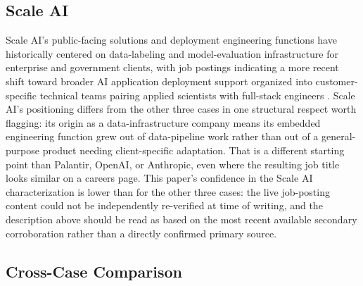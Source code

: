 \documentclass[journal]{IEEEtran}
\begin{document}
\subsection{Scale AI}

Scale AI's public-facing solutions and deployment engineering functions have historically centered on data-labeling and model-evaluation infrastructure for enterprise and government clients, with job postings indicating a more recent shift toward broader AI application deployment support organized into customer-specific technical teams pairing applied scientists with full-stack engineers \cite{scaleai2026fde}. Scale AI's positioning differs from the other three cases in one structural respect worth flagging: its origin as a data-infrastructure company means its embedded engineering function grew out of data-pipeline work rather than out of a general-purpose product needing client-specific adaptation. That is a different starting point than Palantir, OpenAI, or Anthropic, even where the resulting job title looks similar on a careers page. This paper's confidence in the Scale AI characterization is lower than for the other three cases: the live job-posting content could not be independently re-verified at time of writing, and the description above should be read as based on the most recent available secondary corroboration rather than a directly confirmed primary source.

\subsection{Cross-Case Comparison}
\end{document}
